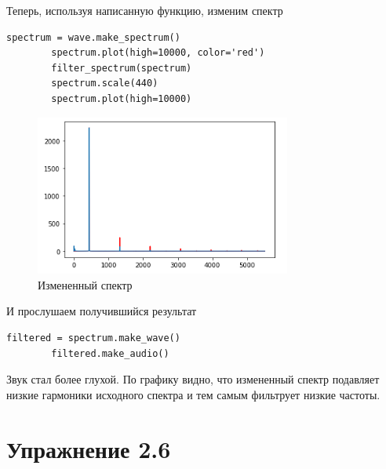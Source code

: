 \documentclass[a4paper,12pt]{article}
\begin{document}
\begin{enumerate}
	Теперь, используя написанную функцию, изменим спектр
	\begin{lstlisting}[caption=Изменение спектра и визуализация результата]
		spectrum = wave.make_spectrum()
		spectrum.plot(high=10000, color='red')
		filter_spectrum(spectrum)
		spectrum.scale(440)
		spectrum.plot(high=10000)
	\end{lstlisting}
	\begin{figure}[H]
		\centering
		\includegraphics[width=0.75\textwidth]{5_1.png}
		\caption{Измененный спектр}
		\label{fig:5.1}
	\end{figure}
	
	И прослушаем получившийся результат
	\begin{lstlisting}[caption=Всопроизведение отфильтрованного спектра]
		filtered = spectrum.make_wave()
		filtered.make_audio()
	\end{lstlisting}

	Звук стал более глухой. По графику видно, что измененный спектр подавляет низкие гармоники исходного спектра и тем самым фильтрует низкие частоты.
	
\end{enumerate}

\newpage

\section{Упражнение 2.6}
\end{document}
